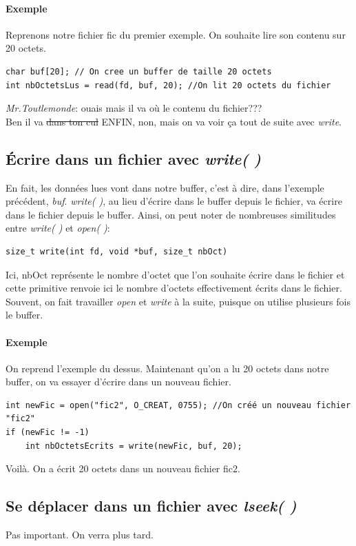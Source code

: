 \documentclass{report}
\begin{document}
\paragraph{Exemple}
Reprenons notre fichier fic du premier exemple. On souhaite lire son contenu sur 20 octets.
\begin{lstlisting}
char buf[20]; // On cree un buffer de taille 20 octets
int nbOctetsLus = read(fd, buf, 20); //On lit 20 octets du fichier
\end{lstlisting}
\textit{Mr.Toutlemonde}: ouais mais il va où le contenu du fichier???\\
Ben il va \sout{dans ton cul} ENFIN, non, mais on va voir ça tout de suite avec \emph{write}.

\subsection{Écrire dans un fichier avec \emph{write( )}}
En fait, les données lues vont dans notre buffer, c'est à dire, dans l'exemple précédent, \emph{buf}. \emph{write( )}, au lieu d'écrire dans le buffer depuis le fichier, va écrire dans le fichier depuis le buffer. Ainsi, on peut noter de nombreuses similitudes entre \emph{write( )} et \emph{open( )}:
\begin{verbatim}
size_t write(int fd, void *buf, size_t nbOct)
\end{verbatim}
Ici, nbOct représente le nombre d'octet que l'on souhaite écrire dans le fichier et cette primitive renvoie ici le nombre d'octets effectivement écrits dans le fichier.\\
Souvent, on fait travailler \emph{open} et \emph{write} à la suite, puisque on utilise plusieurs fois le buffer.
\paragraph{Exemple}
On reprend l'exemple du dessus. Maintenant qu'on a lu 20 octets dans notre buffer, on va essayer d'écrire dans un nouveau fichier.
\begin{lstlisting}
int newFic = open("fic2", O_CREAT, 0755); //On créé un nouveau fichier "fic2"
if (newFic != -1)
	int nbOctetsEcrits = write(newFic, buf, 20);
\end{lstlisting}
Voilà. On a écrit 20 octets dans un nouveau fichier fic2.

\subsection{Se déplacer dans un fichier avec \emph{lseek( )}}
Pas important. On verra plus tard.
\end{document}
